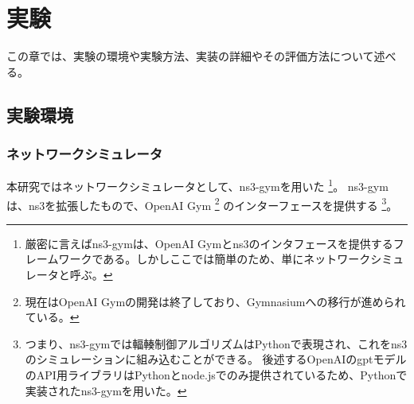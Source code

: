 \documentclass[a4paper,11pt]{jreport}
\begin{document}
\newpage

\chapter{実験}

この章では、実験の環境や実験方法、実装の詳細やその評価方法について述べる。

\section{実験環境}

\subsection{ネットワークシミュレータ}

本研究ではネットワークシミュレータとして、ns3-gym\cite{ns3gym}を用いた
\footnote{厳密に言えばns3-gymは、OpenAI Gymとns3のインタフェースを提供するフレームワークである。しかしここでは簡単のため、単にネットワークシミュレータと呼ぶ。}。
ns3-gymは、ns3\cite{ns3-2012, ns3-2010}を拡張したもので、OpenAI Gym\cite{gym}
\footnote{現在はOpenAI Gymの開発は終了しており、Gymnasiumへの移行が進められている。}
のインターフェースを提供する
\footnote{つまり、ns3-gymでは輻輳制御アルゴリズムはPythonで表現され、これをns3のシミュレーションに組み込むことができる。
後述するOpenAIのgptモデルのAPI用ライブラリはPythonとnode.jsでのみ提供されているため、Pythonで実装されたns3-gymを用いた。
}。
\end{document}
